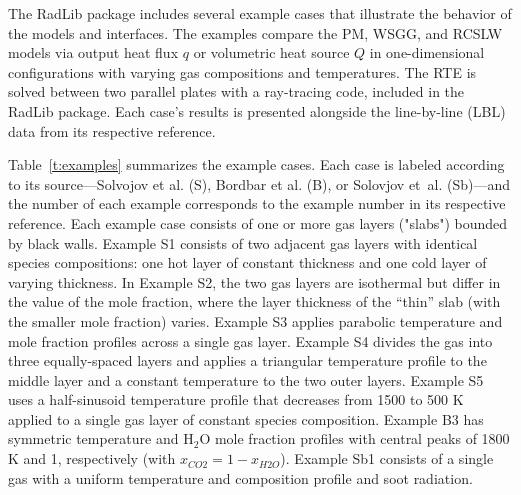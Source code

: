 \documentclass[preprint,12pt]{elsarticle}
\newcounter{bla}
\begin{document}
The RadLib package includes several example cases that illustrate the behavior of the models and interfaces. The examples compare the PM, WSGG, and RCSLW models via output heat flux $q$ or volumetric heat source $Q$ in one-dimensional configurations with varying gas compositions and temperatures. 
The RTE is solved between two parallel plates with a ray-tracing code, included in the RadLib package. Each case's results is presented alongside the line-by-line (LBL) data from its respective reference. 

Table~\ref{t:examples} summarizes the example cases. Each case is labeled according to its source---Solvojov et al. \cite{Solovjov_2017} (S), Bordbar et al. \cite{Bordbar_2020} (B), or Solovjov et~al. \cite{Solovjov_2001} (Sb)---and the number of each example corresponds to the example number in its respective reference. Each example case consists of one or more gas layers ("slabs") bounded by black walls. 
Example S1 consists of two adjacent gas layers with identical species compositions: one hot layer of constant thickness and one cold layer of varying thickness. 
In Example S2, the two gas layers are isothermal but differ in the value of the  mole fraction, where the layer thickness of the ``thin'' slab (with the smaller  mole fraction) varies.
Example S3 applies parabolic temperature and  mole fraction profiles across a single gas layer. 
Example S4 divides the gas into three equally-spaced layers and applies a triangular temperature profile to the middle layer and a constant temperature to the two outer layers.
Example S5 uses a half-sinusoid temperature profile that decreases from 1500 to 500 K applied to a single gas layer of constant species composition.
Example B3 has symmetric temperature and H$_2$O mole fraction profiles with central peaks of 1800 K and 1, respectively (with $x_{CO2}=1-x_{H2O}$). 
Example Sb1 consists of a single gas with a uniform temperature and composition profile and soot radiation. 
%
\end{document}

